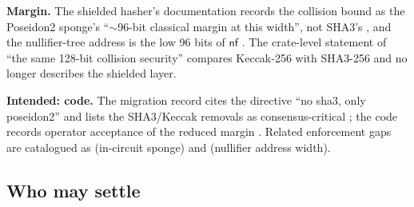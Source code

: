 \begin{specdelta}
\textbf{Margin.} The shielded hasher's documentation records the collision
bound as the Poseidon2 sponge's ``$\sim$96-bit classical margin at this
width'', not SHA3's , and the
nullifier-tree address is the low 96 bits of $\mathsf{nf}$
. The crate-level statement
of ``the same 128-bit collision security'' 
compares Keccak-256 with SHA3-256 and no longer describes the shielded layer.

\textbf{Intended: code.} The migration record cites the directive ``no sha3,
only poseidon2'' and lists the SHA3/Keccak removals as consensus-critical
; the code
records operator acceptance of the reduced margin
. Related enforcement gaps are
catalogued as  (in-circuit sponge) and 
(nullifier address width).
\end{specdelta}

\subsection{Who may settle}
\label{subsec:delta-operator}

